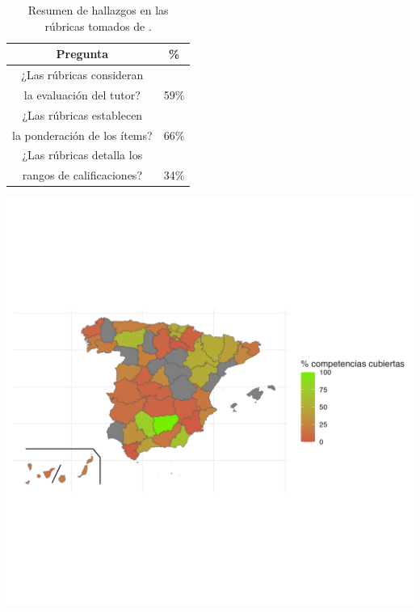 \begin{table}[!ht]
    \begin{varwidth}[b]{0.45\linewidth}
        \centering
            \begin{tabular}{c c}
            \toprule
            \textbf{Pregunta} & \textbf{\%} \\
            \midrule
            ¿Las rúbricas consideran & \\
            la evaluación del tutor? & 59\% \\
            ¿Las rúbricas establecen & \\
            la ponderación de los ítems? &  66\% \\
            ¿Las rúbricas detalla los & \\
            rangos de calificaciones? & 34\%  \\
            \bottomrule
        \end{tabular}
        \caption{Resumen de hallazgos en las rúbricas tomados de \cite{fernandez2023evaluacion}.}
        \label{tab:rubricas}
       \end{varwidth}\hfill
    \begin{minipage}[b]{0.5\linewidth}
        \centering
        \includegraphics[scale=0.5, trim={0 5cm 5cm 5cm}, clip]{images/Mapa_prov.png}
        \label{fig:image}
    \end{minipage}
\end{table}

